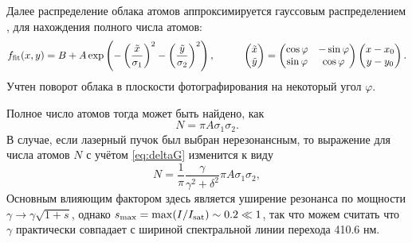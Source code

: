 Далее распределение облака атомов аппроксимируется гауссовым распределением \cite{vlad, suk}, для нахождения полного числа атомов:
\begin{equation}
    \sub{f}{fit}(x, y) = B+A \exp\left(
        - \left(\frac{\tilde{x}}{\sigma_1}\right)^2 - \left(\frac{\tilde{y}}{\sigma_2}\right)^2
    \right),
    \hspace{10 mm} 
    \begin{pmatrix}
        \tilde{x} \\ \tilde{y}
    \end{pmatrix} = \begin{pmatrix}
        \cos \varphi & -\sin \varphi  \\
        \sin \varphi & \cos \varphi  \\
    \end{pmatrix} \begin{pmatrix}
        x-x_0 \\ y - y_0
    \end{pmatrix}.
    \label{eq:photo_fit}
\end{equation}
Учтен поворот облака в плоскости фотографирования на некоторый угол $\varphi$. 

Полное число атомов тогда может быть найдено, как
\begin{equation}
    N = \pi A \sigma_1 \sigma_2.
\end{equation}
В случае, если лазерный пучок был выбран нерезонансным, то выражение для числа атомов $N$ с учётом \eqref{eq:deltaG} изменится к виду
\begin{equation}
    N = \frac{1}{\pi} \frac{\gamma}{\gamma^2+\delta^2} \pi A \sigma_1 \sigma_2,
\end{equation}
Основным влияющим фактором здесь является уширение резонанса по мощности $\gamma \to\gamma \sqrt{1+s}$, однако $s_{\textnormal{max}} = \max (I / I_{\textnormal{sat}}) \sim 0.2 \ll 1$, так что можем считать что $\gamma$ практически совпадает с шириной спектральной линии перехода 410.6 нм.



